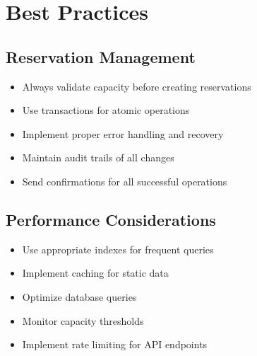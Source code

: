 \section{Best Practices}

\subsection{Reservation Management}
\begin{itemize}
    \item Always validate capacity before creating reservations
    \item Use transactions for atomic operations
    \item Implement proper error handling and recovery
    \item Maintain audit trails of all changes
    \item Send confirmations for all successful operations
\end{itemize}

\subsection{Performance Considerations}
\begin{itemize}
    \item Use appropriate indexes for frequent queries
    \item Implement caching for static data
    \item Optimize database queries
    \item Monitor capacity thresholds
    \item Implement rate limiting for API endpoints
\end{itemize} 